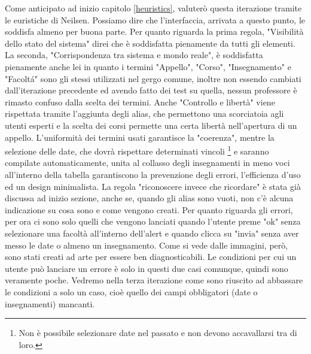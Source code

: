 \documentclass[Lau, oneside, noexaminfo]{sapthesis}%
\begin{document}
Come anticipato ad inizio capitolo \ref{heuristics}, valuterò questa iterazione tramite le euristiche di Neilsen. Possiamo dire che l'interfaccia, arrivata a questo punto, le soddisfa almeno per buona parte.
Per quanto riguarda la prima regola, "Visibilità dello stato del sistema" direi che è soddisfatta pienamente da tutti gli elementi. La seconda, "Corrispondenza tra sistema e mondo reale", è soddisfatta pienamente anche lei in quanto i termini "Appello", "Corso", "Insegnamento" e "Facolt\'a" sono gli stessi utilizzati nel gergo comune, inoltre non essendo cambiati dall'iterazione precedente ed avendo fatto dei test su quella, nessun professore è rimasto confuso dalla scelta dei termini. Anche "Controllo e libertà" viene rispettata tramite l'aggiunta degli alias, che permettono una scorciatoia agli utenti esperti e la scelta dei corsi permette una certa libertà nell'apertura di un appello. L'uniformità dei termini usati garantisce la "coerenza", mentre la selezione delle date, che dovrà rispettare determinati vincoli \footnote{Non è possibile selezionare date nel passato e non devono accavallarsi tra di loro.} e saranno compilate automaticamente, unita al collasso degli insegnamenti in meno voci all'interno della tabella garantiscono la prevenzione degli errori, l'efficienza d'uso ed un design minimalista. La regola "riconoscere invece che ricordare" è stata già discussa ad inizio sezione, anche se, quando gli alias sono vuoti, non c'è alcuna indicazione su cosa sono e come vengono creati. Per quanto riguarda gli errori, per ora ci sono solo quelli che vengono lanciati quando l'utente preme "ok" senza selezionare una facoltà all'interno dell'alert e quando clicca su "invia" senza aver messo le date o almeno un insegnamento. Come si vede dalle immagini, però, sono stati creati ad arte per essere ben diagnosticabili. Le condizioni per cui un utente può lanciare un errore è solo in questi due casi comunque, quindi sono veramente poche. Vedremo nella terza iterazione come sono riuscito ad abbassare le condizioni a solo un caso, cioè quello dei campi obbligatori (date o insegnamenti) mancanti.
\end{document}

